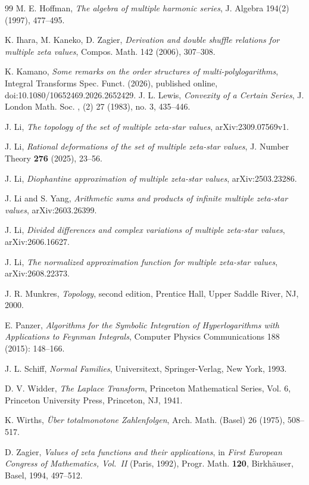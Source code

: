 \documentclass[12pt,a4paper]{amsart}
\numberwithin{equation}{section}
\theoremstyle{plain}
\theoremstyle{definition}
\begin{document}
\begin{thebibliography}{99}
M. E. Hoffman, \emph{The algebra of multiple harmonic series}, J. Algebra 194(2) (1997), 477--495.




K. Ihara, M. Kaneko, D. Zagier,  \emph{Derivation and double shuffle relations for multiple zeta values},
Compos. Math. 142 (2006), 307--308.

K. Kamano, \emph{Some remarks on the order structures of multi-polylogarithms},
  Integral Transforms Spec. Funct. (2026), published online,
{doi:10.1080/10652469.2026.2652429}.
J. L. Lewis, \emph{Convexity of a Certain Series}, J. London Math. Soc. , (2) 27 (1983), no. 3, 435--446. 



J. Li,
\emph{The topology of the set of multiple zeta-star values},
arXiv:2309.07569v1.


J. Li,
\newblock \emph{Rational deformations of the set of multiple zeta-star
values},
\newblock J. Number Theory \textbf{276} (2025), 23--56.


J. Li,
\newblock \emph{Diophantine approximation of multiple zeta-star values},
\newblock arXiv:2503.23286.


J. Li and S. Yang,
\newblock \emph{Arithmetic sums and products of infinite multiple zeta-star
values},
\newblock arXiv:2603.26399.


J. Li,
\newblock \emph{Divided differences and complex variations of multiple
zeta-star values},
\newblock arXiv:2606.16627.

J. Li,
\newblock \emph{The normalized approximation function for multiple zeta-star
values},
\newblock arXiv:2608.22373.



J. R. Munkres,
\emph{Topology}, second edition,
Prentice Hall, Upper Saddle River, NJ, 2000.

E. Panzer,  \emph{Algorithms for the Symbolic Integration of Hyperlogarithms with Applications to Feynman Integrals}, Computer Physics Communications 188 (2015): 148–166. 

J. L. Schiff,
\emph{Normal Families},
Universitext, Springer-Verlag, New York, 1993.

D. V. Widder,
\emph{The Laplace Transform},
Princeton Mathematical Series, Vol. 6,
Princeton University Press, Princeton, NJ, 1941.

K. Wirths,
\emph{\"{U}ber totalmonotone Zahlenfolgen},
Arch. Math. (Basel) 26 (1975), 508--517.

D. Zagier,
 \emph{Values of zeta functions and their applications},
 in \emph{First European Congress of Mathematics, Vol.~II}
(Paris, 1992), Progr. Math. \textbf{120}, Birkh\"auser, Basel, 1994,
497--512.
\end{thebibliography}
\end{document}
